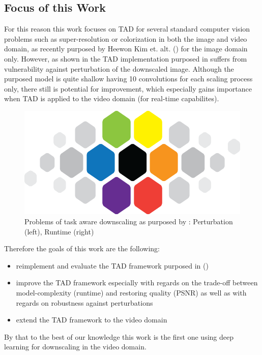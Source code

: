 \subsection{Focus of this Work}
For this reason this work focuses on \ac{TAD} for several standard
computer vision problems such as super-resolution or colorization in both the
image and video domain, as recently purposed by Heewon Kim et. alt. (\cite{TAID})
for the image domain only. However, as shown in 
the \ac{TAD} implementation purposed in \cite{TAID} suffers from vulnerability
against perturbation of the downscaled image. Although the purposed model is
quite shallow having 10 convolutions for each scaling process only, there still
is potential for improvement, which especially gains importance when \ac{TAD} is
applied to the video domain (for real-time capabilites).

\begin{figure}[!htbp]
\centering
\includegraphics[width=14cm]{figures/cvl}
\caption{Problems of task aware downscaling as purposed by \cite{TAID}:
Perturbation (left), Runtime (right)}
\label{fig:taid_problems}
\end{figure}

Therefore the goals of this work are the following:

\begin{itemize}
\item reimplement and evaluate the \ac{TAD} framework purposed in (\cite{TAID})
\item improve the \ac{TAD} framework especially with regards on the trade-off
between model-complexity (runtime) and restoring quality (PSNR) as well as
with regards on robustness against perturbations
\item extend the \ac{TAD} framework to the video domain
\end{itemize}

By that to the best of our knowledge this work is the first one using deep
learning for downscaling in the video domain.

